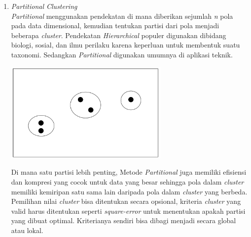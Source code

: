\begin{enumerate}[leftmargin=1.3cm]
	\item \textit{Partitional Clustering} \\
	\textit{Partitional} menggunakan pendekatan di mana diberikan sejumlah \textit{n} pola pada data dimensional, kemudian tentukan partisi dari pola menjadi beberapa \textit{cluster}. Pendekatan \textit{Hierarchical} populer digunakan dibidang biologi, sosial, dan ilmu perilaku karena keperluan untuk membentuk suatu taxonomi. Sedangkan \textit{Partitional} digunakan umumnya di aplikasi teknik. 

	\begin{center}
		\includegraphics[width=8cm]{img/bab_2/partional.png}
		\label{fig:asd}
	\end{center}

	Di mana satu partisi lebih penting, Metode \textit{Partitional} juga memiliki efisiensi dan kompresi yang cocok untuk data yang besar sehingga pola dalam \textit{cluster} memiliki kemiripan satu sama lain daripada pola dalam \textit{cluster} yang berbeda. Pemilihan nilai \textit{cluster} bisa ditentukan secara opsional, kriteria \textit{cluster} yang valid harus ditentukan seperti \textit{square-error} untuk menentukan apakah partisi yang dibuat optimal. Kriterianya sendiri bisa dibagi menjadi secara global atau lokal.  

\end{enumerate}	

